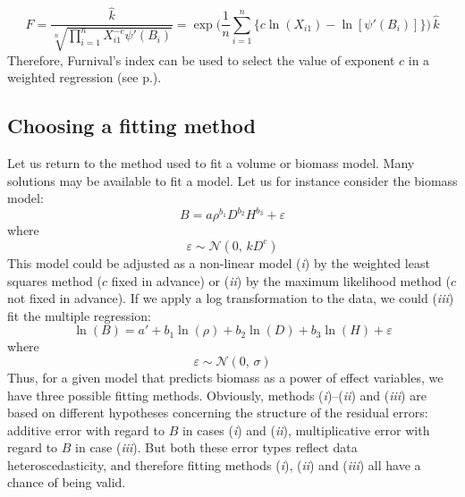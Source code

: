 \[
F=\frac{\hat{k}}{\sqrt[n]{\prod_{i=1}^nX_{i1}^{-c}\psi'(B_i)}}
=\exp\Big(\frac{1}{n}\sum_{i=1}^n\{c\ln(X_{i1})-\ln[\psi'(B_i)]\}
\Big)\,\hat{k}
\]
Therefore, Furnival's index can be used to select the value of exponent $c$ in a weighted regression (see p.\pageref{chx}).

\subsection{Choosing a fitting method}

Let us return to the method used to fit a volume or biomass model. Many solutions may be available to fit a model. Let us for instance consider the biomass model:
\[
B=a\rho^{b_1}D^{b_2}H^{b_3}+\varepsilon
\]
where
\[
\varepsilon\sim\mathcal{N}(0,\,kD^c)
\]
This model could be adjusted as a non-linear model (\emph{i}) by the weighted least squares method ($c$ fixed in advance) or (\emph{ii}) by the maximum likelihood method ($c$ not fixed in advance). If we apply a log transformation to the data, we could (\emph{iii}) fit the multiple regression:
\[
\ln(B)=a'+b_1\ln(\rho)+b_2\ln(D)+b_3\ln(H)+\varepsilon
\]
where
\[
\varepsilon\sim\mathcal{N}(0,\,\sigma)
\]
Thus, for a given model that predicts biomass as a power of effect variables, we have three possible fitting methods. Obviously, methods (\emph{i})--(\emph{ii}) and (\emph{iii}) are based on different hypotheses concerning the structure of the residual errors: additive error with regard to $B$ in cases (\emph{i}) and (\emph{ii}), multiplicative error with regard to $B$ in case (\emph{iii}). But both these error types reflect data heteroscedasticity, and therefore fitting methods (\emph{i}), (\emph{ii}) and (\emph{iii}) all have a chance of being valid.

